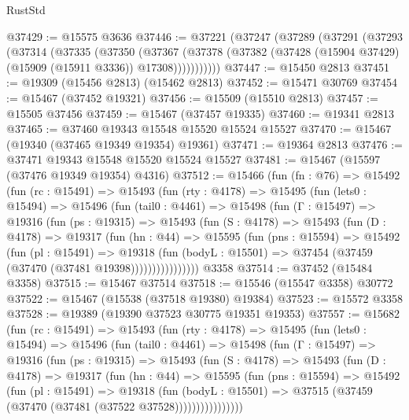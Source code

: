 \begin{lexlean}{RustStd}
\begin{coremodule}
@37429 := @15575 @3636
@37446 := @37221
    (@37247
      (@37289
        (@37291
          (@37293
            (@37314
              (@37335
                (@37350
                  (@37367
                    (@37378
                      (@37382 (@37428 (@15904 @37429) (@15909 (@15911 @3336)) @17308)))))))))))
@37447 := @15450 @2813
@37451 := @19309 (@15456 @2813) (@15462 @2813)
@37452 := @15471 @30769
@37454 := @15467 (@37452 @19321)
@37456 := @15509 (@15510 @2813)
@37457 := @15505 @37456
@37459 := @15467 (@37457 @19335)
@37460 := @19341 @2813
@37465 := @37460 @19343 @15548 @15520 @15524 @15527
@37470 := @15467 (@19340 (@37465 @19349 @19354) @19361)
@37471 := @19364 @2813
@37476 := @37471 @19343 @15548 @15520 @15524 @15527
@37481 := @15467 (@15597 (@37476 @19349 @19354) @4316)
@37512 := @15466
    (fun (fn : @76) =>
    @15492
      (fun (rc : @15491) =>
      @15493
        (fun (rty : @4178) =>
        @15495
          (fun (lets0 : @15494) =>
          @15496
            (fun (tail0 : @4461) =>
            @15498
              (fun (Γ : @15497) =>
              @19316
                (fun (ps : @19315) =>
                @15493
                  (fun (S : @4178) =>
                  @15493
                    (fun (D : @4178) =>
                    @19317
                      (fun (hn : @44) =>
                      @15595
                        (fun (pns : @15594) =>
                        @15492
                          (fun (pl : @15491) =>
                          @19318
                            (fun (bodyL : @15501) =>
                            @37454 (@37459 (@37470 (@37481 @19398))))))))))))))))
    @3358
@37514 := @37452 (@15484 @3358)
@37515 := @15467 @37514
@37518 := @15546 (@15547 @3358) @30772
@37522 := @15467 (@15538 (@37518 @19380) @19384)
@37523 := @15572 @3358
@37528 := @19389 (@19390 @37523 @30775 @19351 @19353)
@37557 := @15682
    (fun (rc : @15491) =>
    @15493
      (fun (rty : @4178) =>
      @15495
        (fun (lets0 : @15494) =>
        @15496
          (fun (tail0 : @4461) =>
          @15498
            (fun (Γ : @15497) =>
            @19316
              (fun (ps : @19315) =>
              @15493
                (fun (S : @4178) =>
                @15493
                  (fun (D : @4178) =>
                  @19317
                    (fun (hn : @44) =>
                    @15595
                      (fun (pns : @15594) =>
                      @15492
                        (fun (pl : @15491) =>
                        @19318
                          (fun (bodyL : @15501) =>
                          @37515 (@37459 (@37470 (@37481 (@37522 @37528))))))))))))))))

\end{coremodule}
\end{lexlean}
